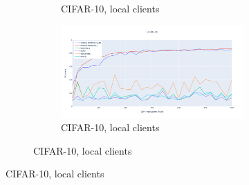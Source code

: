 \documentclass[oneside,a4paper,14pt]{extreport}
\begin{document}
\begin{figure}
\begin{subfigure}{1.\textwidth}
\begin{subfigure}{.25\textwidth}
            \caption{CIFAR-10, local clients}
            \label{fig:cifar_per_old}
        \end{subfigure}
        \begin{subfigure}{.25\textwidth}
            \centering
            \includegraphics[width=\linewidth]{./tab_img/cifar_per_old.png}
            \caption{CIFAR-10, local clients}
            \label{fig:cifar_per_old}
        \end{subfigure}
    \end{subfigure}
\end{figure}
\end{document}
